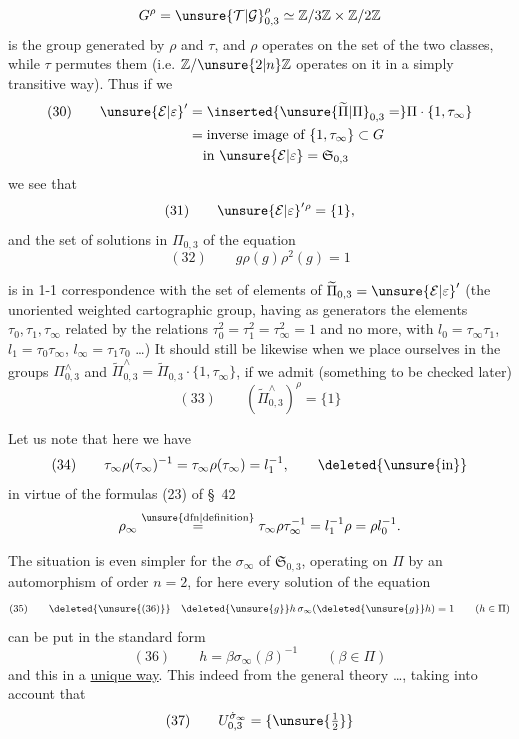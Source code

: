 \[
G^\rho=\unsure{\mathcal T|\mathcal G}_{0,3}^{\rho}
\simeq\mathbb Z/3\mathbb Z\times\mathbb Z/2\mathbb Z
\]
is the group generated by $\rho$ and $\tau$, and $\rho$ operates  on the set of the two classes, while $\tau$ permutes them (i.e. $\mathbb Z/\unsure{2|n}\mathbb Z$  operates on it in a simply transitive way).
Thus if we 
\[
\begin{aligned}
(30)\qquad\unsure{\mathcal E|\varepsilon}'
&=\inserted{\unsure{\widetilde\Pi|\Pi}_{0,3}=}\Pi\cdot\{1,\tau_\infty\}\\
&=\text{inverse image of }\{1,\tau_\infty\}\subset G\\
&\phantom{={}}\text{in }\unsure{\mathcal E|\varepsilon}=\mathfrak S_{0,3}
\end{aligned}
\]
we see that
\[
(31)\qquad\unsure{\mathcal E|\varepsilon}'{}^\rho=\{1\},
\]
and the set of solutions in \uline{$\Pi_{0,3}$} of the equation
\[
(32)\qquad g\rho(g)\rho^2(g)=1
\]


is in 1-1 correspondence with the set of elements of $\widetilde\Pi_{0,3}=\unsure{\mathcal E|\varepsilon}'$ (the unoriented weighted  cartographic group, having as generators the elements $\tau_0,\tau_1,\tau_\infty$ related by the relations $\tau_0^2=\tau_1^2=\tau_\infty^2=1$ and no more, with $l_0=\tau_\infty\tau_1$, $l_1=\tau_0\tau_\infty$, $l_\infty=\tau_1\tau_0$ \dots)
It should still be likewise when we place ourselves in the groups $\Pi_{0,3}^{\wedge}$ and $\widetilde\Pi_{0,3}^{\wedge}=\widetilde\Pi_{0,3}\cdot\{1,\tau_\infty\}$, if we admit (something to be checked later)
\[
(33)\qquad(\widetilde\Pi_{0,3}^{\wedge})^\rho=\{1\}
\]

Let us note that here we have
\[
(34)\qquad\tau_\infty\rho(\tau_\infty)^{-1}
=\tau_\infty\rho(\tau_\infty)=l_1^{-1},
\qquad\deleted{\unsure{\text{in}}}
\]
in virtue of the formulas (23) of \S\ 42
\[
\rho_\infty\overset{\unsure{\mathrm{dfn}|\text{definition}}}{=}
\tau_\infty\rho\tau_\infty^{-1}
=l_1^{-1}\rho=\rho l_0^{-1}.
\]

The situation is even simpler for the  $\sigma_\infty$ of $\mathfrak S_{0,3}$, operating on $\Pi$ by an automorphism of order $n=2$, for here every solution of the  equation
\[
(35)\qquad\deleted{\unsure{(36)}}\quad
\deleted{\unsure{g}}h\,\sigma_\infty(\deleted{\unsure{g}}h)=1
\qquad(h\in\Pi)
\]
can be put in the standard form
\[
(36)\qquad h=\beta\sigma_\infty(\beta)^{-1}
\qquad(\beta\in\Pi)
\]
and this in a \uline{unique way}. This  indeed from the general theory \dots, taking into account that
\[
(37)\qquad U_{0,3}^{\dot\sigma_\infty}=\{\unsure{\tfrac12}\}
\]
